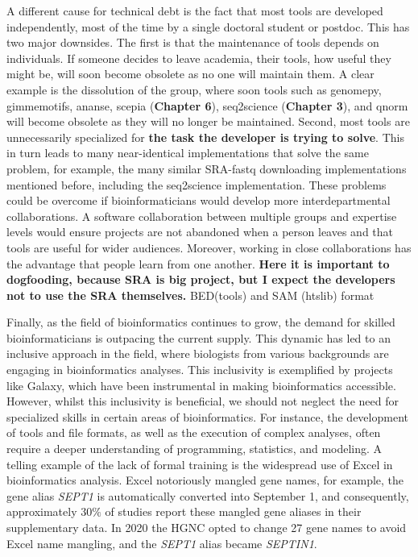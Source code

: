 A different cause for technical debt is the fact that most tools are developed independently, most of the time by a single doctoral student or postdoc. This has two major downsides. The first is that the maintenance of tools depends on individuals. If someone decides to leave academia, their tools, how useful they might be, will soon become obsolete as no one will maintain them. A clear example is the dissolution of the  group, where soon tools such as genomepy\cite{genomepy}, gimmemotifs\cite{Bruse_2018}, ananse\cite{Xu_2020}, scepia (\textbf{Chapter 6}), seq2science\cite{seq2science} (\textbf{Chapter 3}), and qnorm\cite{qnorm} will become obsolete as they will no longer be maintained. Second, most tools are unnecessarily specialized for \textbf{the task the developer is trying to solve}. This in turn leads to many near-identical implementations that solve the same problem, for example, the many similar SRA-fastq downloading implementations mentioned before, including the seq2science implementation. These problems could be overcome if bioinformaticians would develop more interdepartmental collaborations. A software collaboration between multiple groups and expertise levels would ensure projects are not abandoned when a person leaves and that tools are useful for wider audiences. Moreover, working in close collaborations has the advantage that people learn from one another. \textbf{Here it is important to dogfooding, because SRA is big project, but I expect the developers not to use the SRA themselves.} BED(tools) and SAM (htslib) format

Finally, as the field of bioinformatics continues to grow, the demand for skilled bioinformaticians is outpacing the current supply. This dynamic has led to an inclusive approach in the field, where biologists from various backgrounds are engaging in bioinformatics analyses. This inclusivity is exemplified by projects like Galaxy\cite{galaxy}, which have been instrumental in making bioinformatics accessible. However, whilst this inclusivity is beneficial, we should not neglect the need for specialized skills in certain areas of bioinformatics. For instance, the development of tools and file formats, as well as the execution of complex analyses, often require a deeper understanding of programming, statistics, and modeling. A telling example of the lack of formal training is the widespread use of Excel in bioinformatics analysis. Excel notoriously mangled gene names\cite{Zeeberg2004}, for example, the gene alias \textit{SEPT1} is automatically converted into September 1, and consequently, approximately $30\%$ of studies report these mangled gene aliases in their supplementary data\cite{Abeysooriya2021}. In 2020 the HGNC opted to change 27 gene names to avoid Excel name mangling, and the \textit{SEPT1} alias became \textit{SEPTIN1}. 

